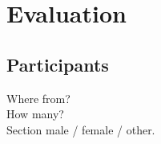 \documentclass[nofilelist,dvipsnames]{cslthse-msc}
\begin{document}
%
%
%
%
%
%
%
%
	\chapter{Evaluation}

	  \section{Participants}

      Where from? \\

      How many? \\

      Section male / female / other. \\
\end{document}
